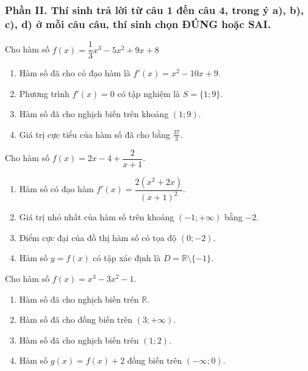 \subsubsection*{Phần II. Thí sinh trả lời từ câu 1 đến câu 4, trong ý a), b), c), d) ở mỗi câu câu, thí sinh chọn ĐÚNG hoặc SAI.}
\setcounter{bt}{0}
\begin{baitap} %
	Cho hàm số $f(x)=\dfrac{1}{3}x^3-5x^2+9x+8$
	\begin{enumerate}[\quad \bf a)]
		\item Hàm số đã cho có đạo hàm là $f'(x)=x^2-10x+9$.
		\item Phương trình $f'(x)=0$ có tập nghiệm là $S=\{1;9\}$.
		\item Hàm số đã cho nghịch biến trên khoảng $(1;9)$.
		\item Giá trị cực tiểu của hàm số đã cho bằng $\frac{37}{3}$.
	\end{enumerate}
\end{baitap}
\begin{baitap}
	Cho hàm số $f(x)=2x-4+\dfrac{2}{x+1}$.
	\begin{enumerate}[\quad \bf a)]
		\item Hàm số có đạo hàm $f'(x)=\dfrac{2(x^2+2x)}{(x+1)^2}$.
		\item Giá trị nhỏ nhất của hàm số trên khoảng $(-1;+\infty)$ bằng $-2$.
		\item Điểm cực đại của đồ thị hàm số có tọa độ $(0;-2)$.
		\item Hàm số $y=f(x)$ có tập xác định là $D=\mathbb{R} \setminus \{-1\}$.
	\end{enumerate}
\end{baitap}
\begin{baitap}
	Cho hàm số $f(x)=x^3-3x^2-1$.
	\begin{enumerate}[\quad \bf a)]
		\item Hàm số đã cho nghịch biến trên $\mathbb{R}$.
		\item Hàm số đã cho đồng biến trên $(3;+\infty)$.
		\item Hàm số đã cho nghịch biến trên $(1;2)$.
		\item Hàm số $g(x)=f(x)+2$ đồng biến trên $(-\infty;0)$.
	\end{enumerate}
\end{baitap}


